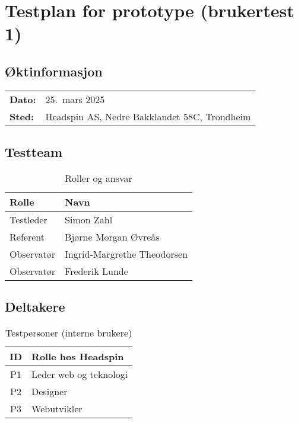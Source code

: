 \section{Testplan for prototype (brukertest 1)}
\label{app:prototype_testplan}

\subsection*{Øktinformasjon}
\begin{tabular}{@{}ll@{}}
\textbf{Dato:}   & 25.\ mars 2025 \\[2pt]
\textbf{Sted:}   & Headspin AS, Nedre Bakklandet 58C, Trondheim
\end{tabular}

\vspace{1em}
\subsection*{Testteam}
\begin{table}[H]
\centering
\caption{Roller og ansvar}
\label{tab:team}
\begin{tabular}{|l|l|}
\hline
\textbf{Rolle} & \textbf{Navn} \\ \hline
Testleder      & Simon Zahl \\ \hline
Referent       & Bjørne Morgan Øvreås \\ \hline
Observatør     & Ingrid‑Margrethe Theodorsen \\ \hline
Observatør     & Frederik Lunde \\ \hline
\end{tabular}
\end{table}

\subsection*{Deltakere}
\begin{table}[H]
\centering
\caption{Testpersoner (interne brukere)}
\label{tab:participants}
\begin{tabular}{|c|l|}
\hline
\textbf{ID} & \textbf{Rolle hos Headspin} \\ \hline
P1 & Leder web og teknologi \\ \hline
P2 & Designer \\ \hline
P3 & Webutvikler \\ \hline
\end{tabular}
\end{table}

